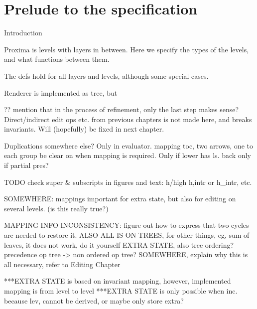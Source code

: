 \chapter{Prelude to the specification} \label{chap:informalSpec}













\bc
Introduction

Proxima is levels with layers in between.
Here we specify the types of the levels, and what functions between them.

The defs hold for all layers and levels, although some special cases.

Renderer is implemented as tree, but
\ec




\bc

?? mention that in the process of refinement, only the last step makes sense? Direct/indirect edit ops etc. from previous chapters is not made here, and breaks invariants. Will (hopefully) be fixed in next chapter.


Duplications somewhere else? Only in evaluator.
mapping toc, two arrows, one to each group
be clear on when mapping is required. Only if lower has ls. back only if partial pres?



TODO
check super & subscripts in figures and text: h/high h,intr or h_intr, etc.

SOMEWHERE: mappings important for extra state, but also for editing on several levels. (is this really true?)

MAPPING INFO INCONSISTENCY: figure out how to express that two cycles are needed to restore it.
ALSO ALL IS ON TREES, for other things, eg, sum of leaves, it does not work, do it yourself
EXTRA STATE, also tree ordering? precedence op tree -> non ordered op tree?
SOMEWHERE, explain why this is all necessary, refer to Editing Chapter


***EXTRA STATE is based on invariant mapping, however, implemented mapping is from level to level
***EXTRA STATE is only possible when inc. because lev, cannot be derived, or maybe only store extra?

